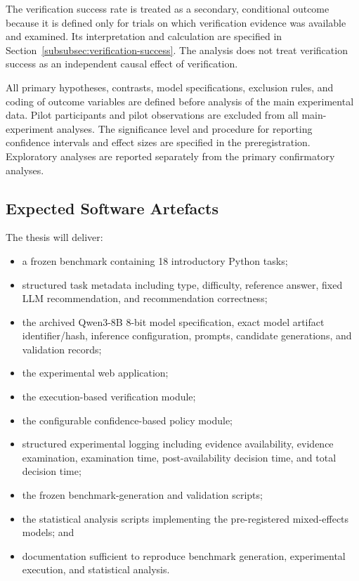 \documentclass[oneside,final,14pt,a4paper]{extreport}
\begin{document}
The verification success rate is treated as a secondary, conditional outcome
because it is defined only for trials on which verification evidence was
available and examined. Its interpretation and calculation are specified in
Section~\ref{subsubsec:verification-success}. The analysis does not treat
verification success as an independent causal effect of verification.

All primary hypotheses, contrasts, model specifications, exclusion rules, and
coding of outcome variables are defined before analysis of the main
experimental data. Pilot participants and pilot observations are excluded
from all main-experiment analyses. The significance level and procedure for
reporting confidence intervals and effect sizes are specified in the
preregistration. Exploratory analyses are reported separately from the
primary confirmatory analyses.


\subsection{Expected Software Artefacts}

The thesis will deliver:

\begin{itemize}

\item a frozen benchmark containing 18 introductory Python tasks;

\item structured task metadata including type, difficulty, reference answer,
fixed LLM recommendation, and recommendation correctness;

\item the archived Qwen3-8B 8-bit model specification, exact model artifact
identifier/hash, inference configuration, prompts, candidate generations, and
validation records;

\item the experimental web application;

\item the execution-based verification module;

\item the configurable confidence-based policy module;

\item structured experimental logging including evidence availability,
evidence examination, examination time, post-availability decision time, and
total decision time;

\item the frozen benchmark-generation and validation scripts;

\item the statistical analysis scripts implementing the pre-registered
mixed-effects models; and

\item documentation sufficient to reproduce benchmark generation,
experimental execution, and statistical analysis.

\end{itemize}
\end{document}
